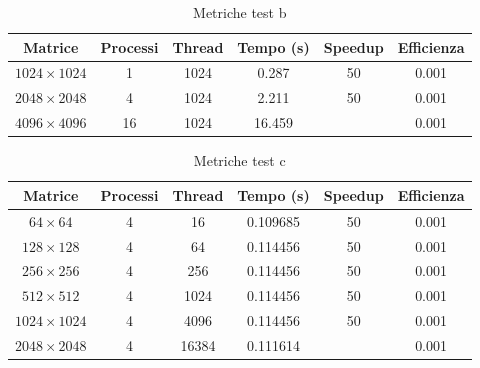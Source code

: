 \begin{table}[h]
    \centering
    \begin{tabular}{cccccc}
        \hline
        \textbf{Matrice}    & \textbf{Processi} & \textbf{Thread} & \textbf{Tempo (s)} & \textbf{Speedup} & \textbf{Efficienza} \\ \hline
        $1024 \times 1024 $ & 1                 & 1024            & 0.287              & 50               & 0.001               \\
        $2048 \times 2048 $ & 4                 & 1024            & 2.211              & 50               & 0.001               \\
        $4096 \times 4096 $ & 16                & 1024            & 16.459             &                  & 0.001               \\ \hline
    \end{tabular}
    \caption{Metriche test b}
\end{table}

\begin{table}[h]
    \centering
    \begin{tabular}{cccccc}
        \hline
        \textbf{Matrice}    & \textbf{Processi} & \textbf{Thread} & \textbf{Tempo (s)} & \textbf{Speedup} & \textbf{Efficienza} \\ \hline
        $64 \times 64 $     & 4                 & 16              & 0.109685           & 50               & 0.001               \\
        $128 \times 128 $   & 4                 & 64              & 0.114456           & 50               & 0.001               \\
        $256 \times 256 $   & 4                 & 256             & 0.114456           & 50               & 0.001               \\
        $512 \times 512 $   & 4                 & 1024            & 0.114456           & 50               & 0.001               \\
        $1024 \times 1024 $ & 4                 & 4096            & 0.114456           & 50               & 0.001               \\
        $2048 \times 2048 $ & 4                 & 16384           & 0.111614           &                  & 0.001               \\ \hline
    \end{tabular}
    \caption{Metriche test c}
\end{table}

